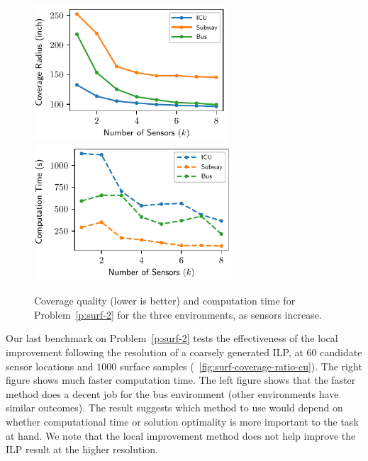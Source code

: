 \begin{figure}[!ht]
    \centering
    \includegraphics[width=.46\columnwidth, height=2in]{chapters/surf/fig/result-radius-mq-eps-converted-to.pdf}
    \includegraphics[width=.46\columnwidth, height=2in]{chapters/surf/fig/result-time-mq-eps-converted-to.pdf}
    \caption{Coverage quality (lower is better) and computation time for Problem~\ref{p:surf-2}
    for the three environments, as sensors increase.}
    \label{fig:surf-coverage-ratio-mq}
\end{figure}

Our last benchmark on Problem~\ref{p:surf-2} tests the effectiveness of the local improvement following the resolution of a coarsely generated ILP, at $60$ candidate sensor locations and $1000$ surface samples (~\ref{fig:surf-coverage-ratio-cu}). The right figure shows much faster computation time. The left figure shows that the  faster method does a decent job for the bus environment (other environments have similar outcomes). The result suggests which method to use would depend on whether computational time or solution optimality is more important to the task at hand. We note that the local improvement method does not help improve the ILP result at the higher resolution. 

